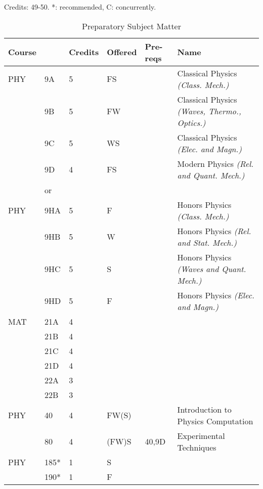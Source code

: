 \documentclass[12pt]{article}
\begin{document}
\begin{table}
\caption{\label{tbl:prep}Preparatory Subject Matter}
\noindent
\vskip 0.25cm
Credits:  49-50. *: recommended, C: concurrently.\\
\begin{tabular}{|llllll|}
\hline
Course & & Credits & Offered & Pre-reqs & Name \\
\hline
PHY & 9A & 5 & FS & & Classical Physics {\it (Class. Mech.)}\\ 
    & 9B & 5 & FW & & Classical Physics {\it (Waves, Thermo., Optics.)}\\ 
    & 9C & 5 & WS & & Classical Physics {\it (Elec. and Magn.)}\\ 
    & 9D & 4 & FS & & Modern Physics {\it (Rel. and Quant. Mech.)}\\ 
\hline
&or&&\\
\hline
PHY & 9HA & 5 & F & & Honors Physics {\it (Class. Mech.)}\\ 
    & 9HB & 5 & W & & Honors Physics {\it (Rel. and Stat. Mech.)}\\ 
    & 9HC & 5 & S & & Honors Physics {\it (Waves and Quant. Mech.)}\\ 
    & 9HD & 5 & F & & Honors Physics {\it (Elec. and Magn.)}\\ 
\hline
\hline
MAT & 21A & 4 & & &\\ 
    & 21B & 4 & & &\\ 
    & 21C & 4 & & &\\ 
    & 21D & 4 & & &\\ 
    & 22A & 3 & & &\\ 
    & 22B & 3 & & &\\ 
PHY & 40  & 4 & FW(S) & & Introduction to Physics Computation \\ 
    & 80  & 4 & (FW)S & 40,9D & Experimental Techniques \\ 
PHY & 185* & 1 & S & & \\ 
    & 190* & 1 & F & & \\ 
\hline
\end{tabular}
\end{table}
\end{document}
